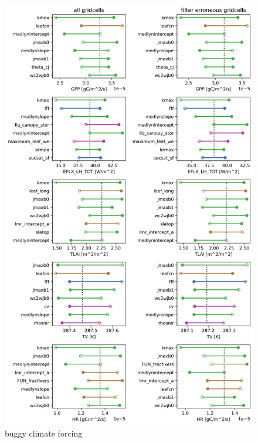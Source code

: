 \documentclass[11pt]{article}
\begin{document}
\begin{figure}[h]
\centering
\includegraphics[width=30pc]{figs/supp/AF2095_rankings.png}
\caption{buggy climate forcing}
\label{supp:abug}
\end{figure}
\end{document}
